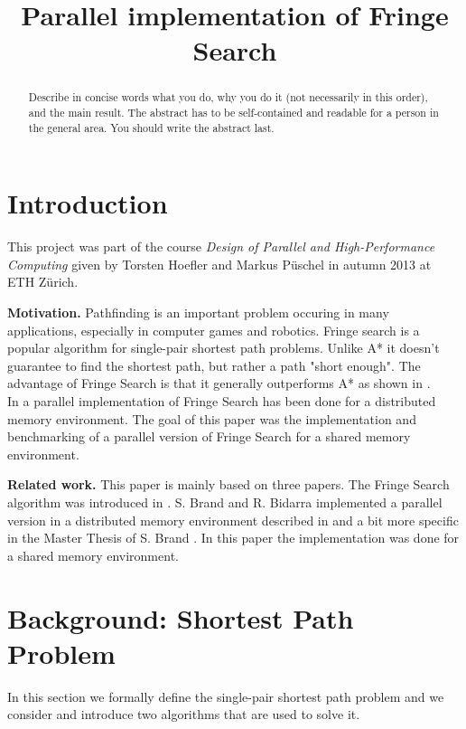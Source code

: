 \documentclass[letterpaper]{article}
\title{Parallel implementation of Fringe Search}
\newcommand{\mypar}[1]{{\bf #1.}}
\begin{document}
%
\maketitle
%

\begin{abstract}
Describe in concise words what you do, why you do it (not necessarily
in this order), and the main result.  The abstract has to be
self-contained and readable for a person in the general area. You
should write the abstract last.
\end{abstract}

\section{Introduction}\label{sec:intro}

This project was part of the course \textit{Design of Parallel and High-Performance Computing} given by Torsten Hoefler and Markus Püschel in autumn 2013 at ETH Zürich.


\mypar{Motivation} 
Pathfinding is an important problem occuring in many applications, especially in computer games and robotics. Fringe search is a popular algorithm for single-pair shortest path problems. Unlike A* it doesn't guarantee to find the shortest path, but rather a path "short enough". The advantage of Fringe Search is that it generally outperforms A* as shown in \cite{fringe:05}.\\
In \cite{brand:09} a parallel implementation of Fringe Search has been done for a distributed memory environment. The goal of this paper was the implementation and benchmarking of a parallel version of Fringe Search for a shared memory environment.

\mypar{Related work} This paper is mainly based on three papers. The Fringe Search algorithm was introduced in \cite{fringe:05}. S. Brand and R. Bidarra implemented a parallel version in a distributed memory environment described in \cite{brand:12} and a bit more specific in the Master Thesis of S. Brand \cite{brand:09}. In this paper the implementation was done for a shared memory environment.

\section{Background: Shortest Path Problem}\label{sec:background}
In this section we formally define the single-pair shortest path problem and we consider and introduce two algorithms that are used to solve it.
\end{document}
